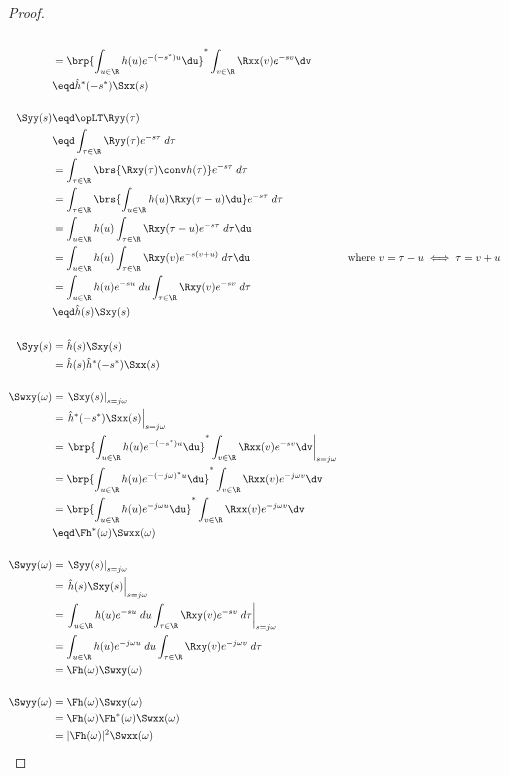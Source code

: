 \begin{proof}
\begin{align*}
   \\&=    \brp{\int_{u\in\R}h(u) e^{-(-s^\ast)u} \du }^\ast
           \int_{v\in\R}\Rxx(v)e^{-sv} \dv
   \\&\eqd \hat{h}^\ast(-s^\ast) \Sxx(s)
\\
\\
   \Syy(s)
     &\eqd \opLT \Ryy(\tau)
   \\&\eqd \int_{\tau\in\R}\Ryy(\tau) e^{-s\tau} \; d\tau
   \\&=    \int_{\tau\in\R}\brs{ \Rxy(\tau) \conv h(\tau) } e^{-s\tau} \; d\tau
   \\&=    \int_{\tau\in\R}\brs{ \int_{u\in\R}h(u) \Rxy(\tau-u)\du } e^{-s\tau} \; d\tau
   \\&=    \int_{u\in\R}h(u) \int_{\tau\in\R}\Rxy(\tau-u) e^{-s\tau} \; d\tau\du
   \\&=    \int_{u\in\R}h(u) \int_{\tau\in\R}\Rxy(v) e^{-s(v+u)} \; d\tau\du
     && \text{where $v=\tau-u\iff \tau=v+u$}
   \\&=    \int_{u\in\R}h(u)e^{-su} \;du \int_{\tau\in\R}\Rxy(v) e^{-sv} \; d\tau
   \\&\eqd \hat{h}(s) \Sxy(s)
\\
\\
   \Syy(s)
     &= \hat{h}(s) \Sxy(s)
   \\&= \hat{h}(s) \hat{h}^\ast(-s^\ast) \Sxx(s)
\\
\\
   \Swxy(\omega)
     &=    \left.\Sxy(s)\right|_{s=j\omega}
   \\&=    \left. \hat{h}^\ast(-s^\ast) \Sxx(s)\right|_{s=j\omega}
   \\&=    \left.
           \brp{\int_{u\in\R}h(u) e^{-(-s^\ast)u} \du }^\ast
           \int_{v\in\R}\Rxx(v)e^{-sv} \dv
           \right|_{s=j\omega}
   \\&=    \brp{\int_{u\in\R}h(u) e^{-(-j\omega)^\ast u} \du }^\ast
           \int_{v\in\R}\Rxx(v)e^{-j\omega v} \dv
   \\&=    \brp{\int_{u\in\R}h(u) e^{-j\omega u} \du }^\ast
           \int_{v\in\R}\Rxx(v)e^{-j\omega v} \dv
   \\&\eqd \Fh^\ast(\omega) \Swxx(\omega)
\\
\\
   \Swyy(\omega)
     &=    \left.\Syy(s)\right|_{s=j\omega}
   \\&=    \left. \hat{h}(s) \Sxy(s) \right|_{s=j\omega}
   \\&=    \left. \int_{u\in\R}h(u)e^{-su} \;du \int_{\tau\in\R}\Rxy(v) e^{-sv} \; d\tau\right|_{s=j\omega}
   \\&=    \int_{u\in\R}h(u)e^{-j\omega u} \;du \int_{\tau\in\R}\Rxy(v) e^{-j\omega v} \; d\tau
   \\&=    \Fh(\omega) \Swxy(\omega)
\\
\\
  \Swyy(\omega)
     &=    \Fh(\omega)\Swxy(\omega)
   \\&=    \Fh(\omega) \Fh^\ast(\omega) \Swxx(\omega)
   \\&=    |\Fh(\omega)|^2 \Swxx(\omega)
\end{align*}
\end{proof}

